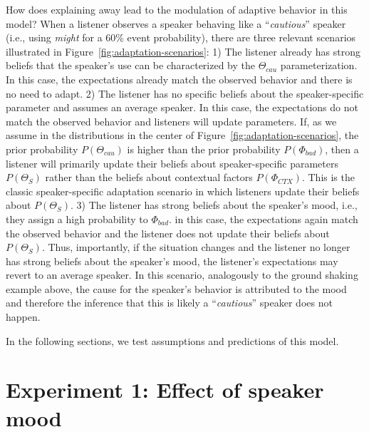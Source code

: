 \documentclass[man,floatsintext]{apa6}
\begin{document}
How does explaining away lead to the modulation of adaptive behavior in this model? When a listener observes a speaker behaving like a ``\textit{cautious}'' speaker (i.e., using \textit{might} for a 60\% event probability), there are three relevant scenarios illustrated in Figure~\ref{fig:adaptation-scenarios}: 1) The listener already has strong beliefs that the speaker's use can be characterized by the $\Theta_{cau}$ parameterization. In this case, the expectations already match the observed behavior and there is no need to adapt. 2) The listener has no specific beliefs about the speaker-specific parameter and assumes an average speaker. In this case, the expectations do not match the observed behavior and listeners will update parameters. If, as we assume in the distributions in the center of Figure~\ref{fig:adaptation-scenarios}, the prior probability $P(\Theta_{cau})$  is higher than the prior probability $P(\Phi_{bad})$, then a listener will primarily update their beliefs about speaker-specific parameters $P(\Theta_S)$ rather than the beliefs about contextual factors $P(\Phi_{CTX})$. This is the classic speaker-specific adaptation scenario in which listeners update their beliefs about $P(\Theta_S)$. 3) The listener has strong beliefs about the speaker's mood, i.e., they assign a high probability to $\Phi_{bad}$. in this case, the expectations again match the observed behavior and the listener does not update their beliefs about $P(\Theta_S)$. Thus, importantly, if the situation changes and the listener no longer has strong beliefs about the speaker's mood, the listener's expectations may revert to an average speaker. In this scenario, analogously to the ground shaking example above, the cause for the speaker's behavior is attributed to the mood and therefore the inference that this is likely a ``\textit{cautious}'' speaker does not happen. 

In the following sections, we test assumptions and predictions of this model. 



\section{Experiment 1: Effect of speaker mood}
\end{document}
